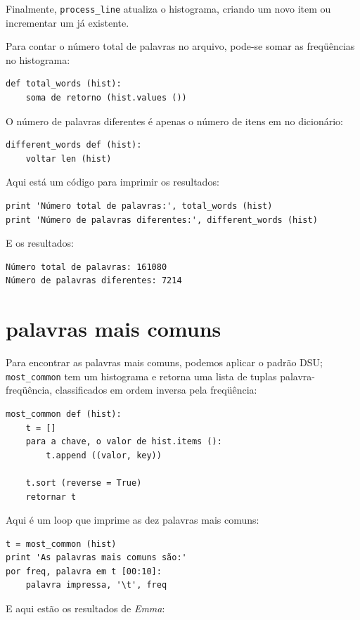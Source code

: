 \documentclass[10pt]{book}
\begin{document}
\begin{v erbatim}
Finalmente, \verb "process_line" atualiza o histograma, criando um novo
item ou incrementar um já existente.

Para contar o número total de palavras no arquivo, pode-se somar
as freqüências no histograma:

\begin{verbatim}
def total_words (hist):
    soma de retorno (hist.values ​​())
\end{verbatim}
%
O número de palavras diferentes é apenas o número de itens em
no dicionário:

\begin{verbatim}
different_words def (hist):
    voltar len (hist)
\end{verbatim}
%
Aqui está um código para imprimir os resultados:

\begin{verbatim}
print 'Número total de palavras:', total_words (hist)
print 'Número de palavras diferentes:', different_words (hist)
\end{verbatim}
%
E os resultados:

\begin{verbatim}
Número total de palavras: 161080
Número de palavras diferentes: 7214
\end{verbatim}
%

\section{palavras mais comuns}

Para encontrar as palavras mais comuns, podemos aplicar o padrão DSU;
\Verb "most_common" tem um histograma e retorna uma lista de
tuplas palavra-freqüência, classificados em ordem inversa pela freqüência:

\begin{verbatim}
most_common def (hist):
    t = []
    para a chave, o valor de hist.items ():
        t.append ((valor, key))

    t.sort (reverse = True)
    retornar t
\end{verbatim}
%
Aqui é um loop que imprime as dez palavras mais comuns:

\begin{verbatim}
t = most_common (hist)
print 'As palavras mais comuns são:'
por freq, palavra em t [00:10]:
    palavra impressa, '\t', freq
\end{verbatim}
%
E aqui estão os resultados de {\em Emma}:


\end{v erbatim}
\end{document}
